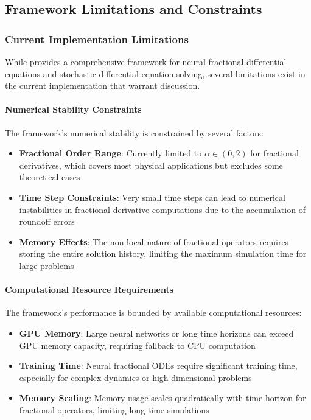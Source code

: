 \subsection{Framework Limitations and Constraints}

\subsubsection{Current Implementation Limitations}

While \hpfracc provides a comprehensive framework for neural fractional differential equations and stochastic differential equation solving, several limitations exist in the current implementation that warrant discussion.

\paragraph{Numerical Stability Constraints}
The framework's numerical stability is constrained by several factors:

\begin{itemize}
    \item \textbf{Fractional Order Range}: Currently limited to $\alpha \in (0, 2)$ for fractional derivatives, which covers most physical applications but excludes some theoretical cases
    \item \textbf{Time Step Constraints}: Very small time steps can lead to numerical instabilities in fractional derivative computations due to the accumulation of roundoff errors
    \item \textbf{Memory Effects}: The non-local nature of fractional operators requires storing the entire solution history, limiting the maximum simulation time for large problems
\end{itemize}

\paragraph{Computational Resource Requirements}
The framework's performance is bounded by available computational resources:

\begin{itemize}
    \item \textbf{GPU Memory}: Large neural networks or long time horizons can exceed GPU memory capacity, requiring fallback to CPU computation
    \item \textbf{Training Time}: Neural fractional ODEs require significant training time, especially for complex dynamics or high-dimensional problems
    \item \textbf{Memory Scaling}: Memory usage scales quadratically with time horizon for fractional operators, limiting long-time simulations
\end{itemize}

